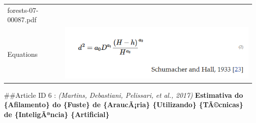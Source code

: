 \documentclass[]{article}
\begin{document}
\begin{longtable}[]{@{}ll@{}}
\begin{minipage}[t]{0.73\columnwidth}
forests-07-00087.pdf\strut
\end{minipage}\tabularnewline
\begin{minipage}[t]{0.21\columnwidth}\raggedright
Equations\strut
\end{minipage} & \begin{minipage}[t]{0.73\columnwidth}\raggedright
\includegraphics{Equations/2016Sunetal.png}\strut
\end{minipage}\tabularnewline
\bottomrule
\end{longtable}

\#\#Article ID 6 : \emph{(Martins, Debastiani, Pelissari, et al., 2017)}
\textbf{Estimativa do \{Afilamento\} do \{Fuste\} de \{AraucÃ¡ria\}
\{Utilizando\} \{TÃ©cnicas\} de \{InteligÃªncia\} \{Artificial\}}
\end{document}
